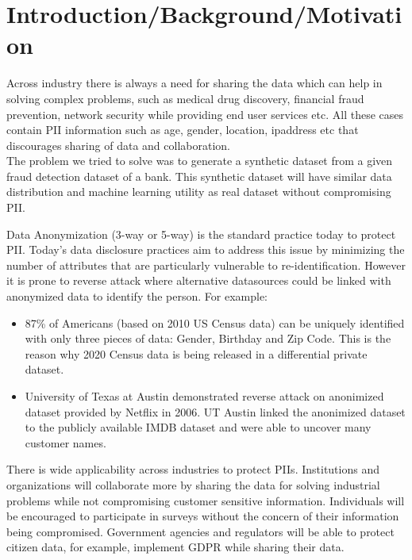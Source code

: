 \documentclass[10pt,twocolumn,letterpaper]{article}
\begin{document}
\section{Introduction/Background/Motivation}

Across industry there is always a need for sharing the data which can help in solving complex problems, such as medical drug discovery, financial fraud prevention, network security while providing end user services etc. All these cases contain PII information such as age, gender, location, ipaddress etc that discourages sharing of data and collaboration.  \\
The problem we tried to solve was to generate a synthetic dataset from a given fraud detection dataset of a bank. This synthetic dataset will have similar data distribution and machine learning utility as real dataset without compromising PII.

Data Anonymization (3-way or 5-way) is the standard practice today to protect PII. Today's data disclosure practices aim to address this issue by minimizing the number of attributes that are particularly vulnerable to re-identification. However it is prone to reverse attack where alternative datasources could be linked with anonymized data to identify the person. For example:
\begin{itemize}
    \item 87\% of Americans (based on 2010 US Census data) can be uniquely identified with only three pieces of data: Gender, Birthday and Zip Code. This is the reason why 2020 Census data is being released in a differential private dataset.

    \item  University of Texas at Austin demonstrated reverse attack on anonimized dataset provided by Netflix in 2006. UT Austin linked the anonimized dataset to the publicly available IMDB dataset and were able to uncover many customer names.
\end{itemize}

There is wide applicability across industries to protect PIIs. Institutions and organizations will collaborate more by sharing the data for solving industrial problems while not compromising customer sensitive information. Individuals will be encouraged to participate in surveys without the concern of their information being compromised. Government agencies and regulators will be able to protect citizen data, for example, implement GDPR while sharing their data.
\end{document}
